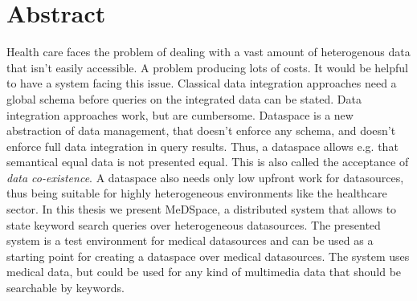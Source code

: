 \chapter*{Abstract}

Health care faces the problem of dealing with a vast amount of heterogenous data that isn't easily accessible. A problem producing lots of costs. It would be helpful to have a system facing this issue. Classical data integration approaches need a global schema before queries on the integrated data can be stated. Data integration approaches work, but are cumbersome.
Dataspace is a new abstraction of data management, that doesn't enforce any schema, and doesn't enforce full data integration in query results. Thus, a dataspace allows e.g. that semantical equal data is not presented equal. This is also called the acceptance of \emph{data co-existence}. A dataspace also needs only low upfront work for datasources, thus being suitable for highly heterogeneous environments like the healthcare sector. 
In this thesis we present MeDSpace, a distributed system that allows to state keyword search queries over heterogeneous datasources. The presented system is a test environment for medical datasources and can be used as a starting point for creating a dataspace over medical datasources. The system uses medical data, but could be used for any kind of multimedia data that should be searchable by keywords.